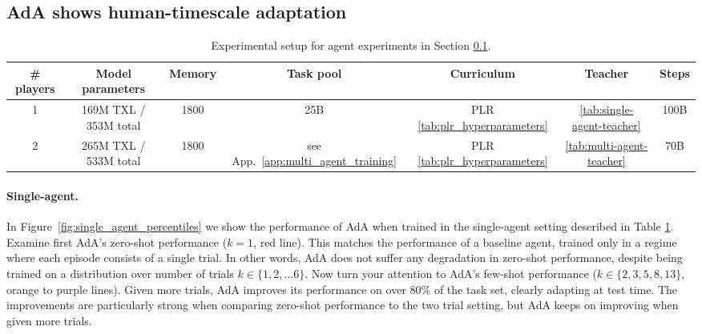 \subsection{AdA shows human-timescale adaptation} \label{sec:results_human_scale_adaptation}

\begin{table}[h!]
  \begin{center}
    \caption{Experimental setup for agent experiments in Section \ref{sec:results_human_scale_adaptation}.}
    \begin{tabular}{c|c|c|c|c|c|c}
    \label{tab:human-timescale-settings}
      \# players & Model parameters & Memory & Task pool & Curriculum & Teacher & Steps\\
      \hline
      1 & 169M TXL / 353M total & 1800 & 25B & PLR \ref{tab:plr_hyperparameters} & \ref{tab:single-agent-teacher} & 100B \\
      2 & 265M TXL / 533M total & 1800 & see App.~\ref{app:multi_agent_training} & PLR \ref{tab:plr_hyperparameters} & \ref{tab:multi-agent-teacher} & 70B \\
    \end{tabular}
  \end{center}
\end{table}

\paragraph{Single-agent.}

In Figure~\ref{fig:single_agent_percentiles} we show the performance of AdA when trained in the single-agent setting described in Table \ref{tab:human-timescale-settings}. Examine first AdA's zero-shot performance ($k=1$, red line). This matches the performance of a baseline agent, trained only in a regime where each episode consists of a single trial. In other words, AdA does not suffer any degradation in zero-shot performance, despite being trained on a distribution over number of trials $k \in \{1, 2, \dots 6\}$. Now turn your attention to AdA's few-shot performance ($k \in \{2, 3, 5, 8, 13\}$, orange to purple lines). Given more trials, AdA improves its performance on over $80\%$ of the task set, clearly adapting at test time. The improvements are particularly strong when comparing zero-shot performance to the two trial setting, but AdA keeps on improving when given more trials. 

